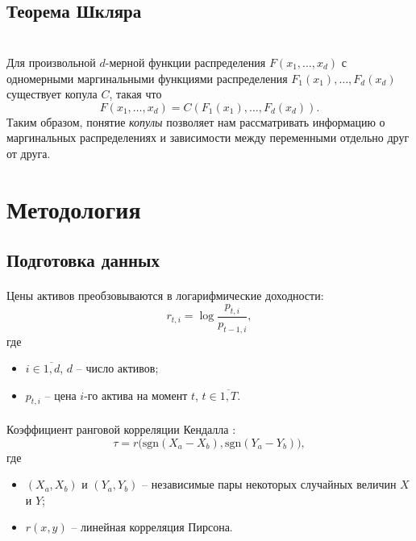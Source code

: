 \documentclass[aspectratio=169]{beamer}
\begin{document}
\subsection{Теорема Шкляра}

\begin{frame}{\insertsection}
    \framesubtitle{\insertsubsection}
    \cite{Sklar1959} \\
    Для произвольной $d$-мерной функции распределения $F(x_1,\ldots,x_d)$ с одномерными маргинальными функциями распределения $F_1(x_1), \ldots, F_d(x_d)$ существует копула $C$, такая что
    $$F(x_1,\ldots,x_d) = C(F_1(x_1), \ldots, F_d(x_d)).$$
    \pause
    Таким образом, понятие \textit{копулы} позволяет нам рассматривать информацию о маргинальных распределениях и зависимости между переменными отдельно друг от друга.
\end{frame}

\section{Методология}
\subsection{Подготовка данных}

\begin{frame}{\insertsection}
    \framesubtitle{\insertsubsection}
    Цены активов преобзовываются в логарифмические доходности:
    \begin{equation}
        r_{t,i}=\log \frac{p_{t,i}}{p_{t-1,i}},
    \end{equation}
    где
    \begin{itemize}
        \item $i \in \overline{1, d}$, $d$ -- число активов;
        \item $p_{t, i}$ -- цена $i$-го актива на момент $t$, $t\in \overline{1, T}$.
    \end{itemize}
\end{frame}

\begin{frame}{\insertsection}
    \framesubtitle{\insertsubsection}
    Коэффициент ранговой корреляции Кендалла \cite{Kendall1970}:
    \begin{equation}
        \tau = r \big( \text{sgn} (X_a - X_b), \text{sgn} (Y_a - Y_b) \big),
    \end{equation}
    где
    \begin{itemize}
        \item $(X_a, X_b)$ и $(Y_a, Y_b)$ -- независимые пары некоторых случайных величин $X$ и $Y$;
        \item $r(x, y)$ -- линейная корреляция Пирсона.
    \end{itemize}
\end{frame}
\end{document}
